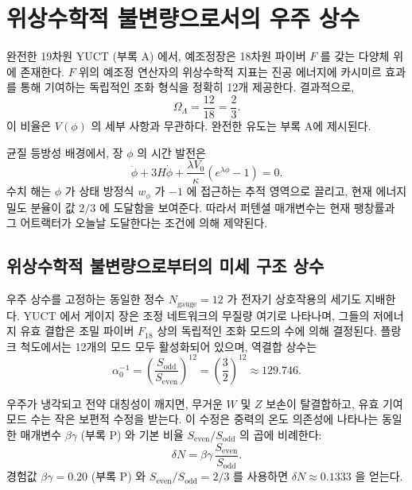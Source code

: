 \documentclass[12pt,a4paper]{article}
\begin{document}
	\section{위상수학적 불변량으로서의 우주 상수}
	
	완전한 19차원 YUCT (부록 A) 에서, 예조정장은 18차원 파이버 \(F\) 를 갖는 다양체 위에 존재한다. \(F\) 위의 예조정 연산자의 위상수학적 지표는 진공 에너지에 카시미르 효과를 통해 기여하는 독립적인 조화 형식을 정확히 12개 제공한다. 결과적으로,
	\begin{equation}
		\Omega_\Lambda = \frac{12}{18} = \frac{2}{3}.
		\label{eq:OmegaLambda}
	\end{equation}
	이 비율은 \(V(\phi)\) 의 세부 사항과 무관하다. 완전한 유도는 부록 A에 제시된다.
	
	균질 등방성 배경에서, 장 \(\phi\) 의 시간 발전은
	\[
	\ddot\phi + 3H \dot\phi + \frac{\lambda V_0}{\kappa}(e^{\lambda\phi}-1) = 0.
	\]
	수치 해는 \(\phi\) 가 상태 방정식 \(w_\phi\) 가 \(-1\) 에 접근하는 추적 영역으로 끌리고, 현재 에너지 밀도 분율이 값 \(2/3\) 에 도달함을 보여준다. 따라서 퍼텐셜 매개변수는 현재 팽창률과 그 어트랙터가 오늘날 도달한다는 조건에 의해 제약된다.
	
	\subsection{위상수학적 불변량으로부터의 미세 구조 상수}
	
	우주 상수를 고정하는 동일한 정수 \(N_{\mathrm{gauge}} = 12\) 가 전자기 상호작용의 세기도 지배한다.  
	YUCT 에서 게이지 장은 조정 네트워크의 무질량 여기로 나타나며, 그들의 저에너지 유효 결합은 조밀 파이버 \(F_{18}\) 상의 독립적인 조화 모드의 수에 의해 결정된다.  
	플랑크 척도에서는 12개의 모드 모두 활성화되어 있으며, 역결합 상수는
	\begin{equation}
		\alpha_0^{-1} = \left( \frac{S_{\mathrm{odd}}}{S_{\mathrm{even}}} \right)^{12}
		= \left( \frac{3}{2} \right)^{12} \approx 129.746 .
	\end{equation}
	
	우주가 냉각되고 전약 대칭성이 깨지면, 무거운 \(W\) 및 \(Z\) 보손이 탈결합하고, 유효 기여 모드 수는 작은 보편적 수정을 받는다.  
	이 수정은 중력의 온도 의존성에 나타나는 동일한 매개변수 \(\beta\gamma\) (부록 P) 와 기본 비율 \(S_{\mathrm{even}}/S_{\mathrm{odd}}\) 의 곱에 비례한다:
	\begin{equation}
		\delta N = \beta\gamma \, \frac{S_{\mathrm{even}}}{S_{\mathrm{odd}}} .
		\label{eq:deltaN}
	\end{equation}
	경험값 \(\beta\gamma = 0.20\) (부록 P) 와 \(S_{\mathrm{even}}/S_{\mathrm{odd}} = 2/3\) 를 사용하면 \(\delta N \approx 0.1333\) 을 얻는다.
	
\end{document}
